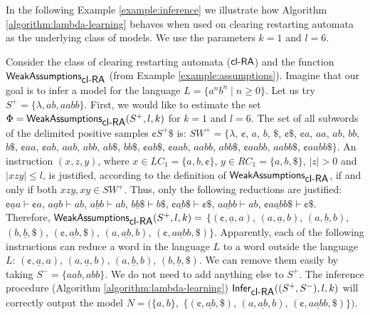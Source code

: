 In the following Example \ref{example:inference} we illustrate how Algorithm \ref{algorithm:lambda-learning} behaves when used on clearing restarting automata as the underlying class of models. We use the parameters $k = 1$ and $l = 6$.

\begin{example}[\cite{C12}]\label{example:inference}
Consider the class of clearing restarting automata ($\mbox{\sf cl-RA\/}$) and the function $ \mathsf{WeakAssumptions}_{\mbox{\sf cl-RA\/}}$ (from Example \ref{example:assumptions}). Imagine that our goal is to infer a model for the language $L = \{ a^n b^n \mid n \ge 0 \}$. Let us try $S^+ = \{\lambda, ab, aabb\}$. First, we would like to estimate the set $\Phi = \mathsf{WeakAssumptions}_{\mbox{\sf cl-RA\/}}(S^+, l, k)$  for $k = 1$ and $l = 6$. The set of all subwords of the delimited positive samples $\cent S^+ \$$ is:
$SW^+ = \{\lambda$, $\cent$, $a$, $b$, $\$$, 
$\cent \$$, $\cent a$, $aa$, $ab$, $bb$, $b \$$, 
$\cent aa$, $\cent ab$, $aab$, $abb$, $ab \$$, $bb \$$, 
$\cent ab \$$, $\cent aab$, $aabb$, $abb \$$, 
$\cent aabb$, $aabb \$$, $\cent aabb \$ \}.$
An instruction $(x, z, y)$, where $x \in LC_1 = \{a, b, \cent\}$,
$y \in RC_1 = \{a, b, \$\}$, $|z| > 0$ and $|xzy| \le l$, is justified, according to the definition of $\mathsf{WeakAssumptions}_{\mbox{\sf cl-RA\/}}$, if and only if both $xzy, xy \in SW^+$. Thus, only the following reductions are justified:
$\cent \underline{a} a \vdash \cent a$,
$a \underline{a} b \vdash ab$,
$a \underline{b} b \vdash ab$,
$b \underline{b} \$ \vdash b\$$,
$\cent \underline{ab} \$ \vdash \cent \$$,
$a \underline{ab} b \vdash ab$,
$\cent \underline{aabb} \$ \vdash \cent \$$.
Therefore, $\mathsf{WeakAssumptions}_{\mbox{\sf cl-RA\/}}(S^+, l, k) = $
$\{(\cent, \underline{a}, a)$,
$(a, \underline{a}, b)$,
$(a, \underline{b}, b)$,
$(b, \underline{b}, \$)$,
$(\cent, \underline{ab}, \$)$,
$(a, \underline{ab}, b)$,
$(\cent, \underline{aabb}, \$) \}$.
Apparently, each of the following instructions can reduce a word in the language $L$ to a word outside the language $L$:
$(\cent, \underline{a}, a)$,
$(a, \underline{a}, b)$,
$(a, \underline{b}, b)$,
$(b, \underline{b}, \$)$.
We can remove them easily by taking $S^- = \{ aab, abb \}$. We do not need to add anything else to $S^+$. The inference procedure (Algorithm \ref{algorithm:lambda-learning}) $\mathsf{Infer}_{\mbox{\sf cl-RA\/}}((S^+, S^-), l, k)$ will correctly output the model $N = (\{a, b\}, $ 
$\{(\cent, \underline{ab}, \$)$,
$(a, \underline{ab}, b) $,
$(\cent, \underline{aabb}, \$) \})$.
\end{example}

